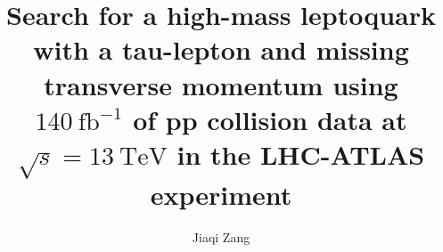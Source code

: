 \title{Search for a high-mass leptoquark with a tau-lepton and missing transverse momentum using \texorpdfstring{$140~\mathrm{fb}^{-1}$}{140 fb-1} of pp collision data at \texorpdfstring{$\sqrt{s}=13~\mathrm{TeV}$}{sqrt(s) = 13 TeV} in the LHC-ATLAS experiment}


\author{Jiaqi Zang}










     

